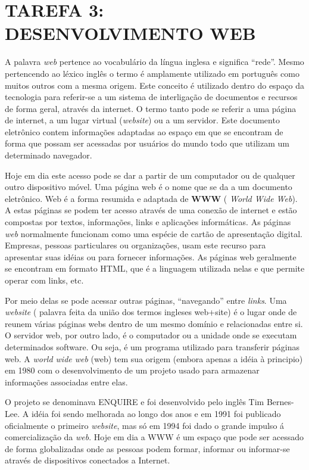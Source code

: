 
\chapter{TAREFA 3: DESENVOLVIMENTO WEB}
\label{sec:tarefa3}

A palavra \textit{web} pertence ao vocabulário da língua inglesa e significa “rede”. Mesmo pertencendo ao léxico inglês o termo é amplamente utilizado em português como muitos outros com a mesma origem. Este conceito é utilizado dentro do espaço da tecnologia para referir-se a um sistema de interligação de documentos e recursos de forma geral, através da internet. O termo tanto pode se referir a uma página de internet, a um lugar virtual (\textit{website}) ou a um servidor. Este documento eletrônico contem informações adaptadas ao espaço em que se encontram de forma que possam ser acessadas por usuários do mundo todo que utilizam um determinado navegador.

Hoje em dia este acesso pode se dar a partir de um computador ou de qualquer outro dispositivo móvel. Uma página web é o nome que se da a um documento eletrônico. Web é a forma resumida e adaptada de \textbf{WWW} ( \textit{World Wide Web}). A estas páginas se podem ter acesso através de uma conexão de internet e estão compostas por textos, informações, links e aplicações informáticas. As páginas \textit{web} normalmente funcionam como uma espécie de cartão de apresentação digital. Empresas, pessoas particulares ou organizações, usam este recurso para apresentar suas idéias ou para fornecer informações. As páginas web geralmente se encontram em formato HTML, que é a linguagem utilizada nelas e que permite operar com links, etc.

Por meio delas se pode acessar outras páginas, “navegando” entre \textit{links}. Uma \textit{website} ( palavra feita da união dos termos ingleses web+site) é o lugar onde de reunem várias páginas webs dentro de um mesmo domínio e relacionadas entre si. O servidor web, por outro lado, é o computador ou a unidade onde se executam determinados software. Ou seja, é um programa utilizado para transferir páginas web. A \textit{world wide web} (web) tem sua origem (embora apenas a idéia à principio) em 1980 com o desenvolvimento de um projeto usado para armazenar informações associadas entre elas.

O projeto se denominava ENQUIRE e foi desenvolvido pelo inglês Tim Bernes-Lee. A idéia foi sendo melhorada ao longo dos anos e em 1991 foi publicado oficialmente o primeiro \textit{website}, mas só em 1994 foi dado o grande impulso á comercialização da \textit{web}. Hoje em dia a WWW é um espaço que pode ser acessado de forma globalizadas onde as pessoas podem formar, informar ou informar-se através de dispositivos conectados a Internet. \cite{web}

